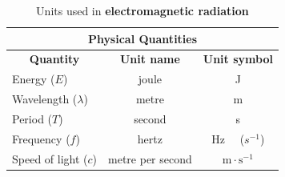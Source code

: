 \begin{table}[H]
\begin{center}
\begin{tabular}{|l|c|c|}\hline \hline 
\multicolumn{3}{|c|}{\textbf{Physical Quantities}}\\ \hline \hline
\multicolumn{1}{|c|}{\textbf{Quantity}} & \textbf{Unit name} & \textbf{Unit symbol}\\ \hline
Energy ($E$) & joule & J \\ \hline
Wavelength ($\lambda$) & metre & m \\ \hline 
Period ($T$) & second & s \\ \hline
Frequency ($f$) & hertz & Hz \ \ ($s^{-1}$) \\ \hline
Speed of light ($c$) & metre per second & $\text{m} \cdot \text{s}^{-1}$ \\ \hline
\end{tabular}
\end{center}
\caption{Units used in \textbf{electromagnetic radiation} }
\label{table:emradiation::units}
\end{table}








